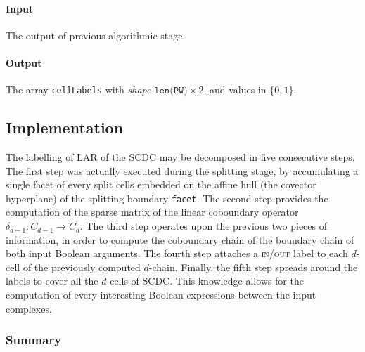 \documentclass[11pt,oneside]{article}	%
\begin{document}
\paragraph{Input}
The output of previous algorithmic stage.

\paragraph{Output}
The array \texttt{cellLabels} with \emph{shape} $\texttt{len(PW)}\times 2$, and values in $\{0,1\}$.


\subsection{Implementation}

The labelling of LAR of the SCDC may be decomposed in five consecutive steps. The first step was actually executed during the splitting stage, by accumulating a single facet of every split cells embedded on the affine hull (the covector hyperplane) of the splitting boundary \texttt{facet}. The second  step provides the computation of the sparse matrix of the linear coboundary operator $\delta_{d-1}: C_{d-1} \to C_d$.
The third step operates upon the previous two pieces of information, in order to compute the coboundary chain of the boundary chain of both input Boolean arguments.
The fourth step attaches a \textsc{in/out} label to each $d$-cell of the previously computed $d$-chain.
Finally, the fifth step spreads around the labels to cover all the $d$-cells of SCDC. This knowledge allows for the computation of every interesting Boolean expressions between the input complexes.

\subsubsection{Summary}
\end{document}
